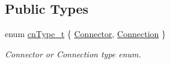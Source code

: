 \subsection*{Public Types}
\begin{DoxyCompactItemize}
\item 
enum \hyperlink{classmdt_tt_logical_test_cable_dialog_a3ca0cca0e179adbc5d6a024eb8ec00f8}{cn\-Type\-\_\-t} \{ \hyperlink{classmdt_tt_logical_test_cable_dialog_a3ca0cca0e179adbc5d6a024eb8ec00f8a4d0173c5c88bfdc73d1616016ef7818c}{Connector}, 
\hyperlink{classmdt_tt_logical_test_cable_dialog_a3ca0cca0e179adbc5d6a024eb8ec00f8af14d6071b76ac17a314bc2bbe5479499}{Connection}
 \}
\begin{DoxyCompactList}\small\item\em Connector or Connection type enum. \end{DoxyCompactList}\end{DoxyCompactItemize}
